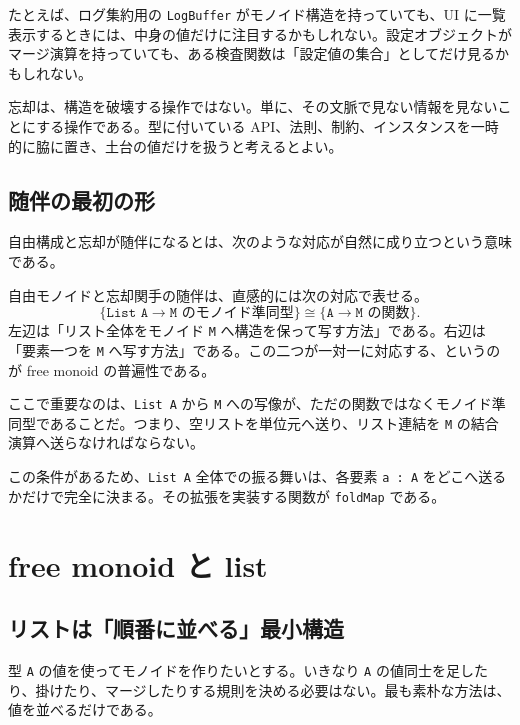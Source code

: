 たとえば、ログ集約用の \texttt{LogBuffer} がモノイド構造を持っていても、UI に一覧表示するときには、中身の値だけに注目するかもしれない。設定オブジェクトがマージ演算を持っていても、ある検査関数は「設定値の集合」としてだけ見るかもしれない。

\begin{softwarebox}
忘却は、構造を破壊する操作ではない。単に、その文脈で見ない情報を見ないことにする操作である。型に付いている API、法則、制約、インスタンスを一時的に脇に置き、土台の値だけを扱うと考えるとよい。
\end{softwarebox}

\subsection{随伴の最初の形}

自由構成と忘却が随伴になるとは、次のような対応が自然に成り立つという意味である。

\begin{definitionbox}
自由モノイドと忘却関手の随伴は、直感的には次の対応で表せる。
\[
  \{\texttt{List A} \to \texttt{M} \text{ のモノイド準同型}\}
  \cong
  \{\texttt{A} \to \texttt{M} \text{ の関数}\}.
\]
左辺は「リスト全体をモノイド \texttt{M} へ構造を保って写す方法」である。右辺は「要素一つを \texttt{M} へ写す方法」である。この二つが一対一に対応する、というのが free monoid の普遍性である。
\end{definitionbox}

ここで重要なのは、\texttt{List A} から \texttt{M} への写像が、ただの関数ではなくモノイド準同型であることだ。つまり、空リストを単位元へ送り、リスト連結を \texttt{M} の結合演算へ送らなければならない。

この条件があるため、\texttt{List A} 全体での振る舞いは、各要素 \texttt{a : A} をどこへ送るかだけで完全に決まる。その拡張を実装する関数が \texttt{foldMap} である。

\section{free monoid と list}
\label{sec:ch31-free-monoid-list}

\subsection{リストは「順番に並べる」最小構造}

型 \texttt{A} の値を使ってモノイドを作りたいとする。いきなり \texttt{A} の値同士を足したり、掛けたり、マージしたりする規則を決める必要はない。最も素朴な方法は、値を並べるだけである。

